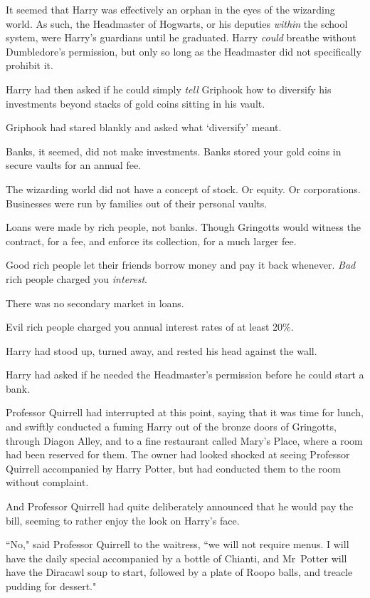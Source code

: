 It seemed that Harry was effectively an orphan in the eyes of the wizarding world. As such, the Headmaster of Hogwarts, or his deputies \emph{within} the school system, were Harry's guardians until he graduated. Harry \emph{could} breathe without Dumbledore's permission, but only so long as the Headmaster did not specifically prohibit it.

Harry had then asked if he could simply \emph{tell} Griphook how to diversify his investments beyond stacks of gold coins sitting in his vault.

Griphook had stared blankly and asked what `diversify' meant.

Banks, it seemed, did not make investments. Banks stored your gold coins in secure vaults for an annual fee.

The wizarding world did not have a concept of stock. Or equity. Or corporations. Businesses were run by families out of their personal vaults.

Loans were made by rich people, not banks. Though Gringotts would witness the contract, for a fee, and enforce its collection, for a much larger fee.

Good rich people let their friends borrow money and pay it back whenever. \emph{Bad} rich people charged you \emph{interest}.

There was no secondary market in loans.

Evil rich people charged you annual interest rates of at least 20\%.

Harry had stood up, turned away, and rested his head against the wall.

Harry had asked if he needed the Headmaster's permission before he could start a bank.

Professor Quirrell had interrupted at this point, saying that it was time for lunch, and swiftly conducted a fuming Harry out of the bronze doors of Gringotts, through Diagon Alley, and to a fine restaurant called Mary's Place, where a room had been reserved for them. The owner had looked shocked at seeing Professor Quirrell accompanied by Harry Potter, but had conducted them to the room without complaint.

And Professor Quirrell had quite deliberately announced that he would pay the bill, seeming to rather enjoy the look on Harry's face.

``No," said Professor Quirrell to the waitress, ``we will not require menus. I will have the daily special accompanied by a bottle of Chianti, and Mr~Potter will have the Diracawl soup to start, followed by a plate of Roopo balls, and treacle pudding for dessert."

